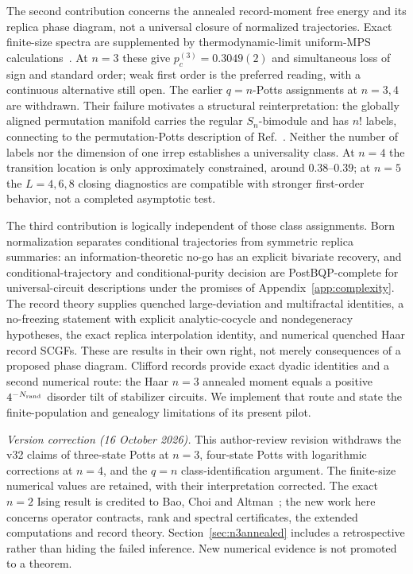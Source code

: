 The second contribution concerns the annealed record-moment free energy and its replica phase diagram, not a universal closure of normalized trajectories. Exact finite-size spectra are supplemented by thermodynamic-limit uniform-MPS calculations~\cite{ZaunerStauber2018,Fishman2018}. At $n=3$ these give $p_c^{(3)}=0.3049(2)$ and simultaneous loss of sign and standard order; weak first order is the preferred reading, with a continuous alternative still open. The earlier $q=n$-Potts assignments at $n=3,4$ are withdrawn. Their failure motivates a structural reinterpretation: the globally aligned permutation manifold carries the regular $S_n$-bimodule and has $n!$ labels, connecting to the permutation-Potts description of Ref.~\cite{Vasseur2019}. Neither the number of labels nor the dimension of one irrep establishes a universality class. At $n=4$ the transition location is only approximately constrained, around $0.38$--$0.39$; at $n=5$ the $L=4,6,8$ closing diagnostics are compatible with stronger first-order behavior, not a completed asymptotic test.

The third contribution is logically independent of those class assignments. Born normalization separates conditional trajectories from symmetric replica summaries: an information-theoretic no-go has an explicit bivariate recovery, and conditional-trajectory and conditional-purity decision are PostBQP-complete for universal-circuit descriptions under the promises of Appendix~\ref{app:complexity}. The record theory supplies quenched large-deviation and multifractal identities, a no-freezing statement with explicit analytic-cocycle and nondegeneracy hypotheses, the exact replica interpolation identity, and numerical quenched Haar record SCGFs. These are results in their own right, not merely consequences of a proposed phase diagram. Clifford records provide exact dyadic identities and a second numerical route: the Haar $n=3$ annealed moment equals a positive $4^{-N_{\rm rand}}$ disorder tilt of stabilizer circuits. We implement that route and state the finite-population and genealogy limitations of its present pilot.

\emph{Version correction (16 October 2026).} This author-review revision withdraws the v32 claims of three-state Potts at $n=3$, four-state Potts with logarithmic corrections at $n=4$, and the $q=n$ class-identification argument. The finite-size numerical values are retained, with their interpretation corrected. The exact $n=2$ Ising result is credited to Bao, Choi and Altman~\cite{Bao2020}; the new work here concerns operator contracts, rank and spectral certificates, the extended computations and record theory. Section~\ref{sec:n3annealed} includes a retrospective rather than hiding the failed inference. New numerical evidence is not promoted to a theorem.

